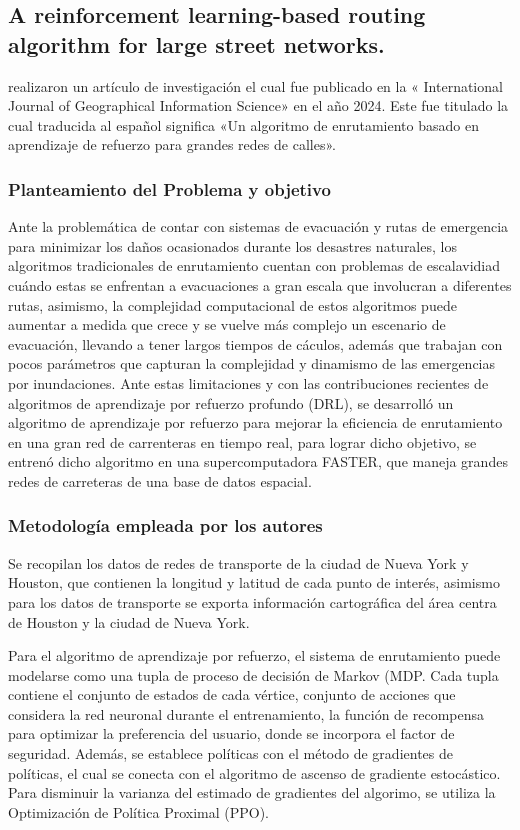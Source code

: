 \subsection{A reinforcement learning-based routing algorithm for large street networks. \citep*{pr_diya}}
\citeauthor{pr_diya} realizaron un artículo de investigación el cual fue publicado en la « International Journal of Geographical Information Science» en el año 2024. Este fue titulado  la cual traducida al español significa «Un algoritmo de enrutamiento basado en aprendizaje de refuerzo para grandes redes de calles».

\subsubsection{Planteamiento del Problema y objetivo }
Ante la problemática de contar con sistemas de evacuación y rutas de emergencia para minimizar los daños ocasionados durante los desastres naturales, los algoritmos tradicionales de enrutamiento cuentan con problemas de escalavidiad cuándo estas se enfrentan a evacuaciones a gran escala que involucran a diferentes rutas, asimismo, la complejidad computacional de estos algoritmos puede aumentar a medida que crece y se vuelve más complejo un escenario de evacuación, llevando a tener largos tiempos de cáculos, además que trabajan con pocos parámetros que capturan la complejidad y dinamismo de las emergencias por inundaciones. Ante estas limitaciones y con las contribuciones recientes de algoritmos de aprendizaje por refuerzo profundo (DRL), se desarrolló un algoritmo de aprendizaje por refuerzo para mejorar la eficiencia de enrutamiento en una gran red de carrenteras en tiempo real, para lograr dicho objetivo, se entrenó dicho algoritmo en una supercomputadora FASTER, que maneja grandes redes de carreteras de una base de datos espacial.

\subsubsection{Metodología empleada por los autores}
Se recopilan los datos de redes de transporte de la ciudad de Nueva York y Houston, que contienen la longitud y latitud de cada punto de interés, asimismo para los datos de transporte se exporta información cartográfica del área centra de Houston y la ciudad de Nueva York. 

Para el algoritmo de aprendizaje por refuerzo, el sistema de enrutamiento puede modelarse como una tupla de proceso de decisión de Markov (MDP. Cada tupla contiene el conjunto de estados de cada vértice, conjunto de acciones que considera la red neuronal durante el entrenamiento, la función de recompensa para optimizar la preferencia del usuario, donde se incorpora el factor de seguridad. Además, se establece políticas con el método de gradientes de políticas, el cual se conecta con el algoritmo de ascenso de gradiente estocástico. Para disminuir la varianza del estimado de gradientes del algorimo, se utiliza la Optimización de Política Proximal (PPO). 

